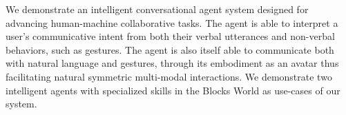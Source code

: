 We demonstrate an intelligent conversational agent system designed for advancing human-machine collaborative tasks. The agent is able to interpret a user's communicative intent from both their verbal utterances and non-verbal behaviors, such as gestures. The agent is also itself able to communicate both with natural language and gestures, through its embodiment as an avatar thus facilitating natural symmetric multi-modal interactions. We demonstrate two intelligent agents with specialized skills in the Blocks World as use-cases of our system.
